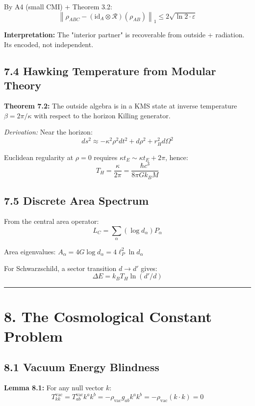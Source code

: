 By A4 (small CMI) + Theorem 3.2: \[\left\|\rho_{ABC} - (\text{id}_A \otimes \mathcal{R})(\rho_{AB})\right\|_1 \leq 2\sqrt{\ln 2 \cdot \varepsilon}\]

\textbf{Interpretation:} The "interior partner" is recoverable from outside + radiation. It\textquotesingle s encoded, not independent.

\subsection{7.4 Hawking Temperature from Modular Theory}\label{74-hawking-temperature-from-modular-theory}

\textbf{Theorem 7.2:} The outside algebra is in a KMS state at inverse temperature \(\beta = 2\pi/\kappa\) with respect to the horizon Killing generator.

\emph{Derivation:} Near the horizon: \[ds^2 \approx -\kappa^2 \rho^2 dt^2 + d\rho^2 + r_H^2 d\Omega^2\]

Euclidean regularity at \(\rho = 0\) requires \(\kappa t_E \sim \kappa t_E + 2\pi\), hence: \[T_H = \frac{\kappa}{2\pi} = \frac{\hbar c^3}{8\pi G k_B M}\]

\subsection{7.5 Discrete Area Spectrum}\label{75-discrete-area-spectrum}

From the central area operator: \[L_C = \sum_\alpha (\log d_\alpha) P_\alpha\]

Area eigenvalues: \(A_\alpha = 4G \log d_\alpha = 4\ell_P^2 \ln d_\alpha\)

For Schwarzschild, a sector transition \(d \to d'\) gives: \[\Delta E = k_B T_H \ln(d'/d)\]

\begin{center}\rule{0.5\linewidth}{0.5pt}\end{center}

\section{8. The Cosmological Constant Problem}\label{8-the-cosmological-constant-problem}

\subsection{8.1 Vacuum Energy Blindness}\label{81-vacuum-energy-blindness}

\textbf{Lemma 8.1:} For any null vector \(k\): \[T^{\text{vac}}_{kk} = T^{\text{vac}}_{ab} k^a k^b = -\rho_{\text{vac}} g_{ab} k^a k^b = -\rho_{\text{vac}}(k \cdot k) = 0\]

